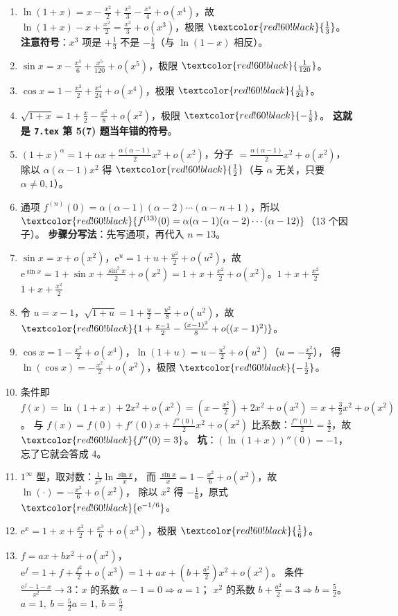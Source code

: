 \documentclass[11pt,a4paper]{ctexart}
\newcommand{\ee}{\mathrm{e}}
\newcommand{\ans}[1]{\ifmmode\textcolor{red!60!black}{#1}\else\textbf{\textcolor{red!60!black}{#1}}\fi}
\begin{document}
\begin{enumerate}[label=\textbf{B\arabic*.},start=1]
  \item $\ln(1+x)=x-\frac{x^{2}}2+\frac{x^{3}}3-\frac{x^{4}}4+o(x^{4})$，故
        $\ln(1+x)-x+\frac{x^{2}}2=\frac{x^{3}}3+o(x^{3})$，极限 $\ans{\frac13}$。
        \textbf{注意符号}：$x^{3}$ 项是 $+\frac13$ 不是 $-\frac13$（与 $\ln(1-x)$ 相反）。
  \item $\sin x=x-\frac{x^{3}}6+\frac{x^{5}}{120}+o(x^{5})$，极限 $\ans{\frac1{120}}$。
  \item $\cos x=1-\frac{x^{2}}2+\frac{x^{4}}{24}+o(x^{4})$，极限 $\ans{\frac1{24}}$。
  \item $\sqrt{1+x}=1+\frac{x}{2}-\frac{x^{2}}8+o(x^{2})$，极限 $\ans{-\frac18}$。
        \textbf{这就是 \texttt{7.tex} 第 5(7) 题当年错的符号}。
  \item $(1+x)^{\alpha}=1+\alpha x+\frac{\alpha(\alpha-1)}{2}x^{2}+o(x^{2})$，分子 $=\frac{\alpha(\alpha-1)}2x^{2}+o(x^{2})$，
        除以 $\alpha(\alpha-1)x^{2}$ 得 $\ans{\frac12}$（与 $\alpha$ 无关，只要 $\alpha\neq0,1$）。
  \item 通项 $f^{(n)}(0)=\alpha(\alpha-1)(\alpha-2)\cdots(\alpha-n+1)$，所以
        $\ans{f^{(13)}(0)=\alpha(\alpha-1)(\alpha-2)\cdots(\alpha-12)}$（13 个因子）。
        \textbf{步骤分写法}：先写通项，再代入 $n=13$。
  \item $\sin x=x+o(x^{2})$，$\ee^{u}=1+u+\frac{u^{2}}2+o(u^{2})$，故
        $\ee^{\sin x}=1+\sin x+\frac{\sin^{2}x}2+o(x^{2})=1+x+\frac{x^{2}}2+o(x^{2})$。\ans{$1+x+\frac{x^{2}}2$}
  \item 令 $u=x-1$，$\sqrt{1+u}=1+\frac{u}{2}-\frac{u^{2}}8+o(u^{2})$，故
        $\ans{1+\frac{x-1}{2}-\frac{(x-1)^{2}}8+o((x-1)^{2})}$。
  \item $\cos x=1-\frac{x^{2}}2+o(x^{4})$，$\ln(1+u)=u-\frac{u^{2}}2+o(u^{2})$（$u=-\frac{x^{2}}2$），
        得 $\ln(\cos x)=-\frac{x^{2}}2+o(x^{2})$，极限 $\ans{-\frac12}$。
  \item 条件即 $f(x)=\ln(1+x)+2x^{2}+o(x^{2})=\left(x-\frac{x^{2}}2\right)+2x^{2}+o(x^{2})
        =x+\frac32x^{2}+o(x^{2})$。
        与 $f(x)=f(0)+f'(0)x+\frac{f''(0)}2x^{2}+o(x^{2})$ 比系数：$\frac{f''(0)}2=\frac32$，故 $\ans{f''(0)=3}$。
        \textbf{坑}：$(\ln(1+x))''(0)=-1$，忘了它就会答成 $4$。
  \item $1^\infty$ 型，取对数：$\frac{1}{x^{2}}\ln\frac{\sin x}{x}$，
        而 $\frac{\sin x}{x}=1-\frac{x^{2}}6+o(x^{2})$，故 $\ln(\cdot)=-\frac{x^{2}}6+o(x^{2})$，
        除以 $x^{2}$ 得 $-\frac16$，原式 $\ans{\ee^{-1/6}}$。
  \item $\ee^{x}=1+x+\frac{x^{2}}2+\frac{x^{3}}6+o(x^{3})$，极限 $\ans{\frac16}$。
  \item $f=ax+bx^{2}+o(x^{2})$，$\ee^{f}=1+f+\frac{f^{2}}2+o(x^{3})
        =1+ax+\left(b+\frac{a^{2}}2\right)x^{2}+o(x^{2})$。
        条件 $\frac{\ee^{f}-1-x}{x^{2}}\to3$：$x$ 的系数 $a-1=0\Rightarrow a=1$；
        $x^{2}$ 的系数 $b+\frac{a^{2}}2=3\Rightarrow b=\frac52$。\ans{$a=1,\ b=\frac52$}
\end{enumerate}
\end{document}
